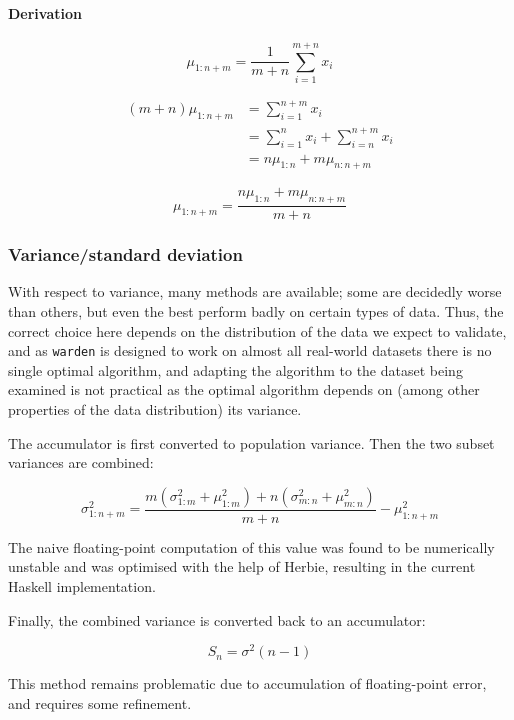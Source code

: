 \documentclass[a4paper]{article}
\begin{document}
\paragraph{Derivation}\label{derivation}

\[\mu_{1:n+m} = \frac{1}{m+n} \sum\limits_{i=1}^{m+n} x_i\]

\[\begin{aligned}(m + n) \mu_{1:n+m} &= \sum\limits_{i=1}^{n+m} x_i \\
                                     &= \sum\limits_{i=1}^n x_i + \sum\limits_{i=n}^{n+m} x_i \\
                                     &= n\mu_{1:n} + m\mu_{n:n+m}\end{aligned}\]

\[\mu_{1:n+m} = \frac{n\mu_{1:n} + m\mu_{n:n+m}}{m + n}\]

\subsubsection{Variance/standard
deviation}\label{variancestandard-deviation}

With respect to variance, many methods are available; some are decidedly
worse than others, but even the best perform badly on certain types of
data. Thus, the correct choice here depends on the distribution of the
data we expect to validate, and as \texttt{warden} is designed to work
on almost all real-world datasets there is no single optimal algorithm,
and adapting the algorithm to the dataset being examined is not
practical as the optimal algorithm depends on (among other properties of
the data distribution) its variance.\cite{Ling1974}

The accumulator is first converted to population variance. Then the two
subset variances are combined:

\[\sigma_{1:n+m}^2 = \frac{m(\sigma_{1:m}^2 + \mu_{1:m}^2) + n(\sigma_{m:n}^2 + \mu_{m:n}^2)}{m + n} - \mu_{1:n+m}^2\]

The naive floating-point computation of this value was found to be
numerically unstable and was optimised with the help of Herbie\cite{panchekha2015},
resulting in the current Haskell implementation.

Finally, the combined variance is converted back to an accumulator:

\[S_n = \sigma^2(n - 1)\]

This method remains problematic due to accumulation of floating-point
error, and requires some refinement.
\end{document}
